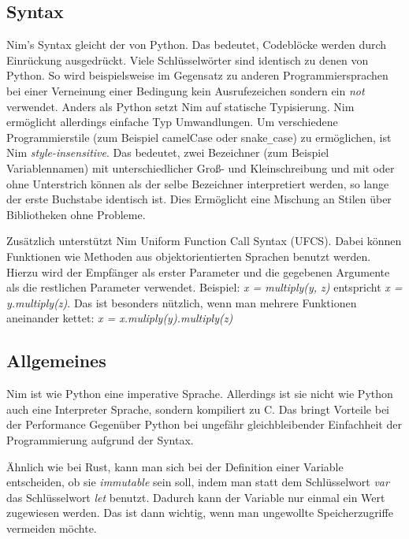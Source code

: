 \documentclass[11pt]{report}
\begin{document}
\subsection{Syntax}
Nim's Syntax gleicht der von Python. Das bedeutet, Codeblöcke werden durch Einrückung ausgedrückt. Viele  Schlüsselwörter sind identisch zu denen von Python. So wird beispielsweise im Gegensatz zu anderen Programmiersprachen bei einer Verneinung einer Bedingung kein Ausrufezeichen sondern ein \emph{not} verwendet. Anders als Python setzt Nim auf statische Typisierung. Nim ermöglicht allerdings einfache Typ Umwandlungen.
\newline
Um verschiedene Programmierstile (zum Beispiel camelCase oder snake\verb|_|case) zu ermöglichen, ist Nim \emph{style-insensitive}. Das bedeutet, zwei Bezeichner (zum Beispiel Variablennamen) mit unterschiedlicher Groß- und Kleinschreibung und mit oder ohne Unterstrich können als der selbe Bezeichner interpretiert werden, so lange der erste Buchstabe identisch ist. Dies Ermöglicht eine Mischung an Stilen über Bibliotheken ohne Probleme.

Zusätzlich unterstützt Nim Uniform Function Call Syntax (UFCS). Dabei können Funktionen wie Methoden aus objektorientierten Sprachen benutzt werden. Hierzu wird der Empfänger als erster Parameter und die gegebenen Argumente als die restlichen Parameter verwendet. Beispiel:
\newline
\emph{x = multiply(y, z)} entspricht \emph{x = y.multiply(z)}.
\newline
Das ist besonders nützlich, wenn man mehrere Funktionen aneinander kettet:
\newline
\emph{x = x.muliply(y).multiply(z)}

\subsection{Allgemeines}
Nim ist wie Python eine imperative Sprache. Allerdings ist sie nicht wie Python auch eine Interpreter Sprache, sondern kompiliert zu C. Das bringt Vorteile bei der Performance Gegenüber Python bei ungefähr gleichbleibender Einfachheit der Programmierung aufgrund der Syntax.

Ähnlich wie bei Rust, kann man sich bei der Definition einer Variable entscheiden, ob sie \emph{immutable} sein soll, indem man statt dem Schlüsselwort \emph{var} das Schlüsselwort \emph{let} benutzt. Dadurch kann der Variable nur einmal ein Wert zugewiesen werden. Das ist dann wichtig, wenn man ungewollte Speicherzugriffe vermeiden möchte.
\end{document}
